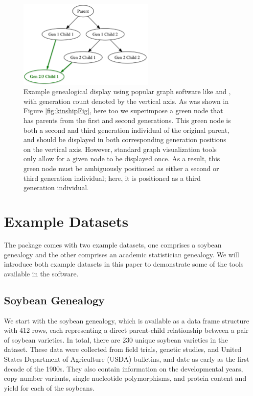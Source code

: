 \documentclass[article,shortnames]{jss}
\begin{document}
\begin{figure}[h]
    \centering
    \includegraphics[width=0.6\textwidth]{Graph}
    \caption{Example genealogical display using popular graph software like  and , with generation count denoted by the vertical axis. As was shown in Figure \ref{fig:kinshipFig}, here too we superimpose a green node that has parents from the first and second generations. This green node is both a second and third generation individual of the original parent, and should be displayed in both corresponding generation positions on the vertical axis. However, standard graph visualization tools only allow for a given node to be displayed once. As a result, this green node must be ambiguously positioned as either a second or third generation individual; here, it is positioned as a third generation individual.}
    \label{fig:Graph}
\end{figure}

\section{Example Datasets}

The  package comes with two example datasets, one comprises a soybean genealogy and the other comprises an academic statistician genealogy. We will introduce both example datasets in this paper to demonstrate some of the tools available in the software.

\subsection{Soybean Genealogy}

We start with the soybean genealogy, which is available as a data frame structure with 412 rows, each representing a direct parent-child relationship between a pair of soybean varieties. In total, there are 230 unique soybean varieties in the dataset. These data were collected from field trials, genetic studies, and United States Department of Agriculture (USDA) bulletins, and date as early as the first decade of the 1900s. They also contain information on the developmental years, copy number variants, single nucleotide polymorphisms, and protein content and yield for each of the soybeans.
\end{document}
